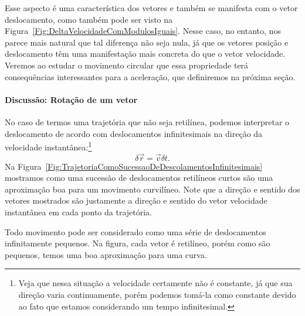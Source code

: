 Esse aspecto é uma característica dos vetores e também se manifesta com o vetor deslocamento, como também pode ser visto na Figura~\ref{Fig:DeltaVelocidadeComModulosIguais}. Nesse caso, no entanto, nos parece mais natural que tal diferença não seja nula, já que os vetores posição e deslocamento têm uma manifestação mais concreta do que o vetor velocidade. Veremos ao estudar o movimento circular que essa propriedade terá consequências interessantes para a aceleração, que definiremos na próxima seção.

\paragraph{Discussão: Rotação de um vetor}
\label{Disc:RotVetor}

No caso de termos uma trajetória que não seja retilínea, podemos interpretar o deslocamento de acordo com deslocamentos infinitesimais na direção da velocidade instantânea:\footnote[][-1cm]{Veja que nessa situação a velocidade certamente não é constante, já que sua direção varia continuamente, porém podemos tomá-la como constante devido ao fato que estamos considerando um tempo infinitesimal.}
\begin{equation}
	\delta \vec{r} = \vec{v} \delta t.
\end{equation}
%
Na Figura~\ref{Fig:TrajetoriaComoSucessaoDeDescolamentosInfinitesimais} mostramos como uma sucessão de deslocamentos retilíneos curtos são uma aproximação boa para um movimento curvilíneo. Note que a direção e sentido dos vetores mostrados são justamente a direção e sentido do vetor velocidade instantânea em cada ponto da trajetória.

\begin{marginfigure}
\centering
{}
\caption{Todo movimento pode ser considerado como uma série de deslocamentos infinitamente pequenos. Na figura, cada vetor é retilíneo, porém como são pequenos, temos uma boa aproximação para uma curva.\label{Fig:TrajetoriaComoSucessaoDeDescolamentosInfinitesimais}}
\end{marginfigure}

